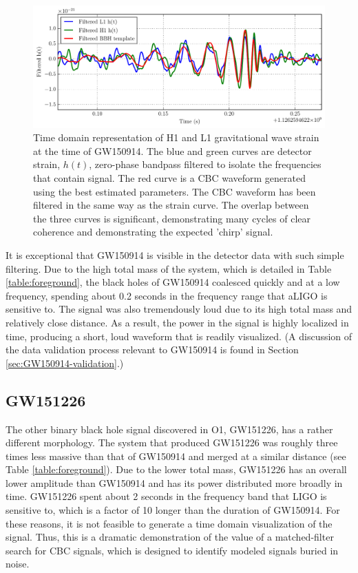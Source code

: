 \begin{figure}[ht!]
\includegraphics[width=\textwidth]{figures/O1/GW150914-timeseries}
\caption[GW150914 timeseries]{Time domain representation of H1 and L1 %
        gravitational wave strain at the time of GW150914. The blue %
        and green curves are detector strain, $h(t)$, zero-phase bandpass %
        filtered to isolate the %
        frequencies that contain signal. The red curve is a CBC waveform %
        generated using the best estimated parameters. The CBC waveform %
        has been filtered in the same way as the strain curve. The overlap %
        between the three curves is significant, demonstrating many cycles %
        of clear coherence and demonstrating the expected 'chirp' signal.}
\label{fig:GW150914}
\end{figure}

It is exceptional that GW150914 is visible in the detector data with 
such simple filtering. Due to the high total mass of the system, 
which is detailed in Table \ref{table:foreground}, the black holes 
of GW150914 coalesced quickly and at a low frequency, spending about 
0.2 seconds in the frequency range that aLIGO is sensitive to. The 
signal was also tremendously loud due to its high total mass and relatively 
close distance. 
As a result, the power in the signal is highly localized in time, 
producing a short, loud waveform that is readily visualized.
(A discussion of the data validation process relevant to GW150914 is 
found in Section \ref{sec:GW150914-validation}.)

\subsection{GW151226}

The other binary black hole signal discovered in O1, GW151226, has a rather different 
morphology. The system that produced GW151226 was roughly three times 
less massive than that of GW150914 and merged 
at a similar distance (see Table \ref{table:foreground}). Due to the 
lower total mass, GW151226 has an overall lower amplitude than GW150914 
and has its power distributed more broadly in time. GW151226 spent about 
2 seconds in the frequency band that LIGO is sensitive to, which is a 
factor of 10 longer than the duration of GW150914. For these reasons, 
it is not feasible to generate a time domain visualization of the signal. 
Thus, this is a dramatic demonstration of the value of a 
matched-filter search for CBC signals, which is designed to identify 
modeled signals buried in noise. 

